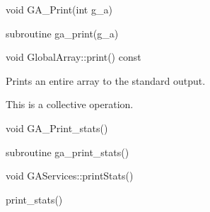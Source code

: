 \documentclass[12pt]{article}
\begin{document}

\begin{capi}
\begin{ccode}
void GA_Print(int g_a)
\end{ccode}
\begin{funcargs}
\end{funcargs}
\end{capi}

\begin{fapi}
\begin{fcode}
subroutine ga_print(g_a)   
\end{fcode}
\begin{funcargs}
\end{funcargs}
\end{fapi}

\begin{cxxapi}
\begin{cxxcode}
void GlobalArray::print() const
\end{cxxcode}
\end{cxxapi}



\begin{desc}

Prints an entire array to the standard output.

This is a collective operation.
\end{desc}


\begin{capi}
\begin{ccode}
void GA_Print_stats()
\end{ccode}
\end{capi}

\begin{fapi}
\begin{fcode}
subroutine ga_print_stats()
\end{fcode}
\end{fapi}

\begin{cxxapi}
\begin{cxxcode}
void GAServices::printStats()
\end{cxxcode}
\end{cxxapi}

\begin{pyapi}
\begin{pycode}
print_stats()  
\end{pycode}
\end{pyapi}
\end{document}

